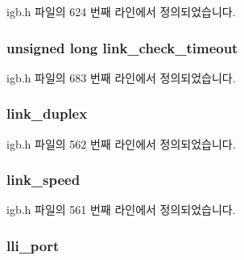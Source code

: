 igb.\+h 파일의 624 번째 라인에서 정의되었습니다.

\subsubsection[{\texorpdfstring{link\+\_\+check\+\_\+timeout}{link_check_timeout}}]{\setlength{\rightskip}{0pt plus 5cm}unsigned long link\+\_\+check\+\_\+timeout}\hypertarget{structigb__adapter_a254e631806307426cd9ce65dd92216db}{}\label{structigb__adapter_a254e631806307426cd9ce65dd92216db}


igb.\+h 파일의 683 번째 라인에서 정의되었습니다.

\subsubsection[{\texorpdfstring{link\+\_\+duplex}{link_duplex}}]{ link\+\_\+duplex}\hypertarget{structigb__adapter_a06adafe39ef2dfbceac0f31970c54196}{}\label{structigb__adapter_a06adafe39ef2dfbceac0f31970c54196}


igb.\+h 파일의 562 번째 라인에서 정의되었습니다.

\subsubsection[{\texorpdfstring{link\+\_\+speed}{link_speed}}]{ link\+\_\+speed}\hypertarget{structigb__adapter_a769b08c3c5ef0960c66136e561a93b67}{}\label{structigb__adapter_a769b08c3c5ef0960c66136e561a93b67}


igb.\+h 파일의 561 번째 라인에서 정의되었습니다.

\subsubsection[{\texorpdfstring{lli\+\_\+port}{lli_port}}]{ lli\+\_\+port}\hypertarget{structigb__adapter_a28be73f7fefebf3f4de8b5b0c143b895}{}\label{structigb__adapter_a28be73f7fefebf3f4de8b5b0c143b895}



